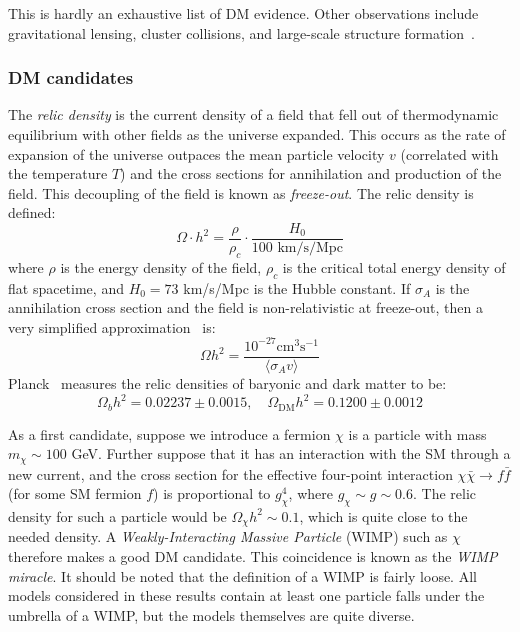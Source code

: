 This is hardly an exhaustive list of DM evidence.
Other observations include gravitational lensing, cluster collisions, and large-scale structure formation~\cite{dm1,dm2}.

\subsubsection{DM candidates}

The \emph{relic density} is the current density of a field that fell out of thermodynamic equilibrium with other fields as the universe expanded.
This occurs as the rate of expansion of the universe outpaces the mean particle velocity $v$ (correlated with the temperature $T$) and the cross sections for annihilation and production of the field.
This decoupling of the field is known as \emph{freeze-out}.
The relic density is defined:
\begin{equation}
    \Omega \cdot h^2 = \frac{\rho}{\rho_c} \cdot \frac{H_0}{100\text{ km/s/Mpc}}
\end{equation}
where $\rho$ is the energy density of the field, $\rho_c$ is the critical total energy density of flat spacetime, and $H_0=73$ km/s/Mpc is the Hubble constant.
If $\sigma_A$ is the annihilation cross section and the field is non-relativistic at freeze-out, then a very simplified approximation~\cite{dm1} is:
\begin{equation}
    \Omega h^2 = \frac{10^{-27}\mathrm{cm}^3\mathrm{s}^{-1}}{\langle \sigma_A v\rangle}
    \label{eq:theory:relic}
\end{equation}
Planck~\cite{planck} measures the relic densities of baryonic and dark matter to be:
\begin{equation}
    \Omega_b h^2 = 0.02237 \pm 0.0015, \quad \Omega_\mathrm{DM} h^2 = 0.1200 \pm 0.0012
\end{equation}

As a first candidate, suppose we introduce a fermion $\chi$ is a particle with mass $m_\chi\sim100$ GeV.
Further suppose that it has an interaction with the SM through a new current, and the cross section for the effective four-point interaction $\chi \bar\chi\rightarrow f\bar f$ (for some SM fermion $f$) is proportional to $g^4_\chi$, where $g_\chi \sim g \sim 0.6$.
The relic density for such a particle would be $\Omega_\chi h^2 \sim 0.1$, which is quite close to the needed density.
A \emph{Weakly-Interacting Massive Particle} (WIMP) such as $\chi$ therefore makes a good DM candidate.
This coincidence is known as the \emph{WIMP miracle}.
It should be noted that the definition of a WIMP is fairly loose.
All models considered in these results contain at least one particle falls under the umbrella of a WIMP, but the models themselves are quite diverse.

